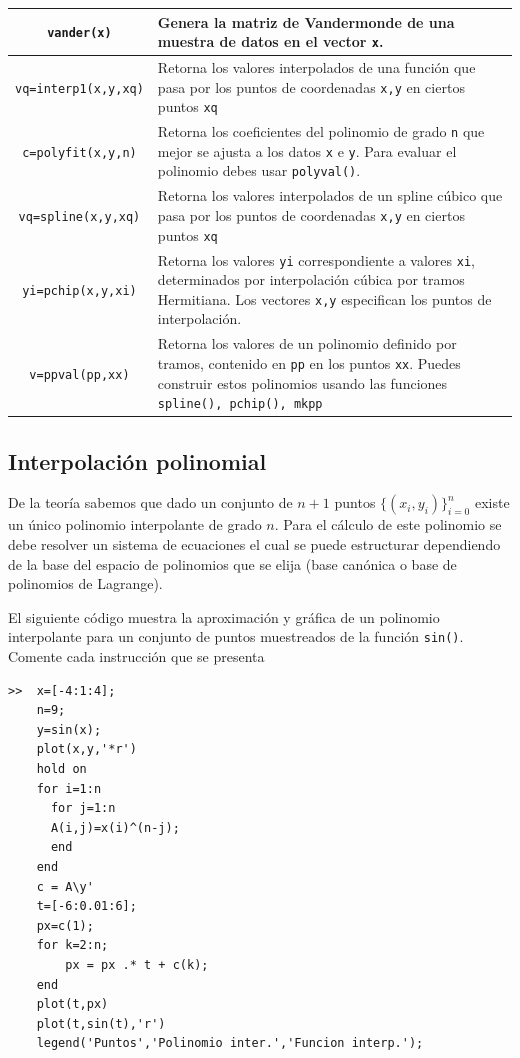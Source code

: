 \documentclass[11pt]{article}
\begin{document}
\begin{longtable}{||c|p{}||}
\hline
\texttt{vander(x)} 			& Genera la matriz de Vandermonde de una muestra de datos en el vector \texttt{x}. \\
\hline
\texttt{vq=interp1(x,y,xq)}	& Retorna los valores interpolados de una funci\'on que pasa por los puntos de coordenadas \texttt{x,y} en ciertos puntos \texttt{xq} \\
\hline
\texttt{c=polyfit(x,y,n)}	& Retorna los coeficientes del polinomio de grado \texttt{n} que mejor se ajusta a los datos \texttt{x} e  \texttt{y}. Para evaluar el polinomio debes usar \texttt{polyval()}. \\
\hline
\texttt{vq=spline(x,y,xq)}	& Retorna los valores interpolados de un spline c\'ubico que pasa por los puntos de coordenadas \texttt{x,y} en ciertos puntos \texttt{xq} \\
\hline 
\texttt{yi=pchip(x,y,xi)}	& Retorna los valores \texttt{yi} correspondiente a valores \texttt{xi}, determinados por interpolaci\'on c\'ubica por tramos Hermitiana. Los vectores \texttt{x,y} especifican los puntos de interpolaci\'on. \\
\hline
\texttt{v=ppval(pp,xx)}		& Retorna los valores de un polinomio definido por tramos, contenido en \texttt{pp} en los puntos \texttt{xx}. Puedes construir estos polinomios usando las funciones \texttt{spline(), pchip(), mkpp} 
\\
\hline
\end{longtable}


\subsection{Interpolaci\'on polinomial}
De la teor\'ia sabemos que dado un conjunto de $n+1$ puntos $\{(x_i,y_i)\}_{i=0}^{n}$ existe un \'unico polinomio interpolante de grado $n$. Para el c\'alculo de este polinomio se debe resolver un sistema de ecuaciones el cual se puede estructurar dependiendo de la base del espacio de polinomios que se elija (base can\'onica o base de polinomios de Lagrange). 

El siguiente c\'odigo muestra la aproximaci\'on y gr\'afica de un polinomio interpolante para un conjunto de puntos muestreados de la funci\'on \texttt{sin()}. Comente cada instrucci\'on que se presenta 

\begin{verbatim}
>> 	x=[-4:1:4];
	n=9;
    y=sin(x); 
    plot(x,y,'*r') 
    hold on 
    for i=1:n 
      for j=1:n 
      A(i,j)=x(i)^(n-j);  
      end 
    end 
    c = A\y' 
    t=[-6:0.01:6]; 
    px=c(1); 
    for k=2:n; 
    	px = px .* t + c(k); 
    end 
    plot(t,px)
    plot(t,sin(t),'r')
    legend('Puntos','Polinomio inter.','Funcion interp.');
\end{verbatim}
\end{document}
